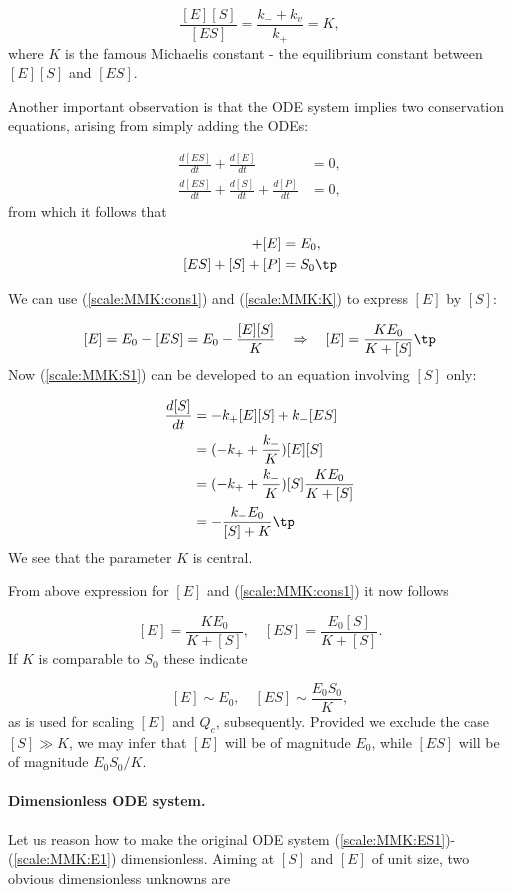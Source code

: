 \documentclass[graybox,envcountchap,sectrefs,final]{svmonodo}
\begin{document}
\begin{equation}
\frac{[E][S]}{[ES]} = \frac{k_- + k_v}{k_+} = K,
\label{scale:MMK:K}
\end{equation}
where $K$ is the famous Michaelis constant - the equilibrium constant
between $[E][S]$ and $[ES]$.

Another important observation is that the ODE system implies
two conservation equations, arising from simply adding the ODEs:

\begin{align}
\frac{d[ES]}{dt} + \frac{d[E]}{dt} & =0,\\ 
\frac{d[ES]}{dt} + \frac{d[S]}{dt} + \frac{d[P]}{dt} &= 0,
\end{align}
from which it follows that

\begin{align}
[ES] + [E] &= E_0,
\label{scale:MMK:cons1}\\ 
[ES] + [S] + [P] &= S_0\tp
\label{scale:MMK:cons2}
\end{align}

We can use (\ref{scale:MMK:cons1}) and (\ref{scale:MMK:K}) to
express $[E]$ by $[S]$:

\[ [E] = E_0 - [ES] = E_0 - \frac{[E][S]}{K}\quad\Rightarrow\quad
[E] = \frac{KE_0}{K + [S]}\tp\]
Now (\ref{scale:MMK:S1}) can be developed to an equation involving
$[S]$ only:

\begin{align}
\frac{d[S]}{dt} &= -k_+[E][S] + k_-[ES]\nonumber\\ 
& = (-k_+ + \frac{k_-}{K})[E][S]\nonumber\\ 
& = (-k_+ + \frac{k_-}{K})[S]\frac{KE_0}{K + [S]}\nonumber\\ 
& = - \frac{k_-E_0}{[S] + K}\tp
\label{scale:MMK:Seq1}
\end{align}
We see that the parameter $K$ is central.

From above expression for $[E]$ and (\ref{scale:MMK:cons1}) it now follows

\[
[E]=\frac{K E_0}{K+[S]},\quad [ES]=\frac{E_0[S]}{K+[S]}.
\]
If $K$ is comparable to $S_0$ these indicate

\[
[E]\sim E_0,\quad [ES]\sim \frac{E_0 S_0}{K},
\]
as is used for scaling $[E]$ and $Q_c$, subsequently.
Provided we exclude the case $[S]\gg K$, we may infer that $[E]$ will be of magnitude $E_0$, while $[ES]$ will be of magnitude $E_0 S_0/K$.

\paragraph{Dimensionless ODE system.}
Let us reason how to make the original ODE system
(\ref{scale:MMK:ES1})-(\ref{scale:MMK:E1}) dimensionless.
Aiming at $[S]$ and $[E]$ of unit size, two obvious dimensionless
unknowns are
\end{document}
